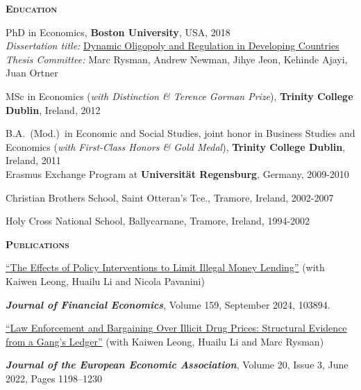 \documentclass[11pt,overlapped,line,letterpaper]{article}
\newcommand{\cvsec}[1]{\vspace{\baselineskip}\textbf{\textsc{#1}}}
\newenvironment{list1}{
  \begin{list}{\ding{113}}{%
      \setlength{\itemsep}{0in}\setlength{\itemindent}{-1.5em}
      \setlength{\parsep}{0in}\setlength{\parskip}{0in}
      \setlength{\topsep}{0in}\setlength{\partopsep}{0in}
      \setlength{\leftmargin}{0.5in}}}{\end{list}}
\begin{document}
\cvsec{Education}
\begin{list1}
\item[] PhD in Economics, \textbf{Boston University}, USA, 2018 \\
  \emph{Dissertation title:} \href{https://open.bu.edu/handle/2144/33202?show=full}{Dynamic Oligopoly and Regulation in Developing Countries} \\
  \emph{Thesis Committee:} Marc Rysman, Andrew Newman, Jihye Jeon, Kehinde Ajayi, Juan Ortner
  \vspace{5pt}
\item[] MSc in Economics (\emph{with Distinction \& Terence Gorman Prize}), \textbf{Trinity College Dublin}, Ireland, 2012\hspace{-2mm}
  \vspace{5pt}
\item[] B.A.~(Mod.)~in Economic and Social Studies, joint honor in Business Studies and Economics (\emph{with First-Class Honors \& Gold Medal}), \textbf{Trinity College Dublin}, Ireland, 2011
  \\ Erasmus Exchange Program at \textbf{Universität Regensburg}, Germany, 2009-2010
  \vspace{5pt}
\item[] Christian Brothers School, Saint Otteran's Tce., Tramore, Ireland, 2002-2007
\item[] Holy Cross National School, Ballycarnane, Tramore, Ireland, 1994-2002
\end{list1}

\cvsec{Publications}
\begin{list1}
  \item[] \href{https://doi.org/10.1016/j.jfineco.2024.103894}{``The Effects of Policy Interventions to Limit Illegal Money Lending''} (with Kaiwen Leong, Huailu Li and Nicola Pavanini)
    \par \textsl{\textbf{Journal of Financial Economics}}, Volume 159, September 2024, 103894.
\item[] \href{https://doi.org/10.1093/jeea/jvac003}{``Law Enforcement and Bargaining Over Illicit Drug Prices: Structural Evidence from a Gang's Ledger''} (with Kaiwen Leong, Huailu Li and Marc Rysman)
  \par \textsl{\textbf{Journal of the European Economic Association}},  Volume 20, Issue 3, June 2022, Pages 1198–1230
\end{list1}
\end{document}
